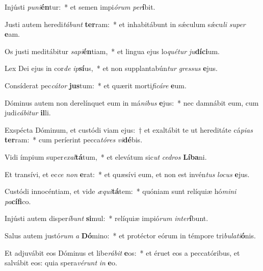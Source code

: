 \item Injústi \textit{pu}\textit{ni}\textbf{én}tur:~* et semen impi\textit{ó}\textit{rum} \textit{per}\textbf{í}bit.
\item Justi autem heredi\textit{tá}\textit{bunt} \textbf{ter}ram:~* et inhabitábunt in sǽculum sǽcu\textit{li} \textit{su}\textit{per} \textbf{e}am.
\item Os justi meditábitur \textit{sa}\textit{pi}\textbf{én}tiam,~* et lingua ejus lo\textit{qué}\textit{tur} \textit{ju}\textbf{dí}\textbf{ci}um.
\item Lex Dei ejus in cor\textit{de} \textit{ip}\textbf{sí}us,~* et non supplantabún\textit{tur} \textit{gres}\textit{sus} \textbf{e}jus.
\item Consíderat pec\textit{cá}\textit{tor} \textbf{jus}tum:~* et quærit morti\textit{fi}\textit{cá}\textit{re} \textbf{e}um.
\item Dóminus autem non derelínquet eum in má\textit{ni}\textit{bus} \textbf{e}jus:~* nec damnábit eum, cum judi\textit{cá}\textit{bi}\textit{tur} \textbf{il}li.
\item Exspécta Dóminum, et custódi viam ejus:~† et exaltábit te ut hereditáte cá\textit{pi}\textit{as} \textbf{ter}ram:~* cum períerint pecca\textit{tó}\textit{res} \textit{vi}\textbf{dé}bis.
\item Vidi ímpium super\textit{ex}\textit{al}\textbf{tá}tum,~* et elevátum sic\textit{ut} \textit{ce}\textit{dros} \textbf{Lí}\textbf{ba}ni.
\item Et transívi, et ec\textit{ce} \textit{non} \textbf{e}rat:~* et quæsívi eum, et non est invén\textit{tus} \textit{lo}\textit{cus} \textbf{e}jus.
\item Custódi innocéntiam, et vide \textit{æ}\textit{qui}\textbf{tá}tem:~* quóniam sunt relíquiæ hó\textit{mi}\textit{ni} \textit{pa}\textbf{cí}\textbf{fi}co.
\item Injústi autem disper\textit{í}\textit{bunt} \textbf{si}mul:~* relíquiæ impió\textit{rum} \textit{in}\textit{ter}\textbf{í}bunt.
\item Salus autem justó\textit{rum} \textit{a} \textbf{Dó}mino:~* et protéctor eórum in témpore tri\textit{bu}\textit{la}\textit{ti}\textbf{ó}nis.
\item Et adjuvábit eos Dóminus et libe\textit{rá}\textit{bit} \textbf{e}os:~* et éruet eos a peccatóribus, et salvábit eos: quia spera\textit{vé}\textit{runt} \textit{in} \textbf{e}o.
